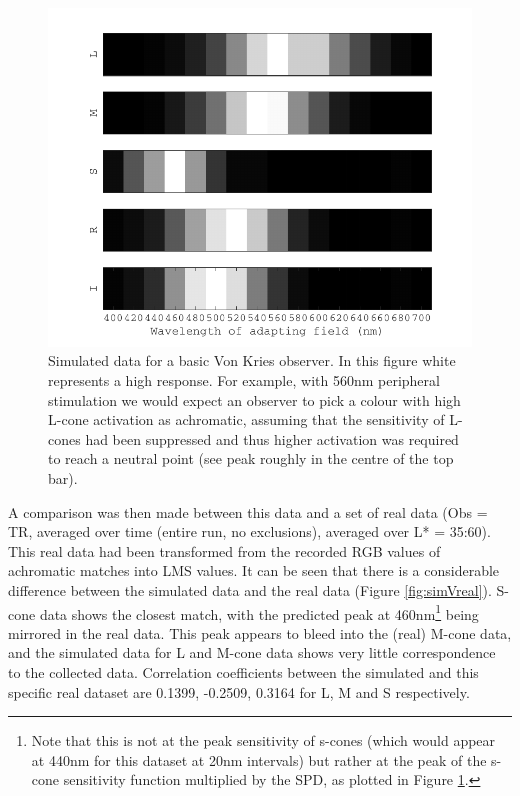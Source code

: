 \begin{figure}[htbp]
\includegraphics[max width=\textwidth]{figs/LargeSphere/LSsimdata.pdf}
\caption{Simulated data for a basic Von Kries observer. In this figure white represents a high response. For example, with 560nm peripheral stimulation we would expect an observer to pick a colour with high L-cone activation as achromatic, assuming that the sensitivity of L-cones had been suppressed and thus higher activation was required to reach a neutral point (see peak roughly in the centre of the top bar).}
\label{fig:LSsimdata}
\end{figure}

A comparison was then made between this data and a set of real data (Obs = TR, averaged over time (entire run, no exclusions), averaged over L* = 35:60). This real data had been transformed from the recorded RGB values of achromatic matches into LMS values. It can be seen that there is a considerable difference between the simulated data and the real data (Figure \ref{fig:simVreal}). S-cone data shows the closest match, with the predicted peak at 460nm\footnote{Note that this is not at the peak sensitivity of s-cones (which would appear at 440nm for this dataset at 20nm intervals) but rather at the peak of the s-cone sensitivity function multiplied by the \gls{SPD}, as plotted in Figure \ref{fig:LSsimdata}.} being mirrored in the real data. This peak appears to bleed into the (real) M-cone data, and the simulated data for L and M-cone data shows very little correspondence to the collected data. Correlation coefficients between the simulated and this specific real dataset are 0.1399, -0.2509, 0.3164 for L, M and S respectively.

